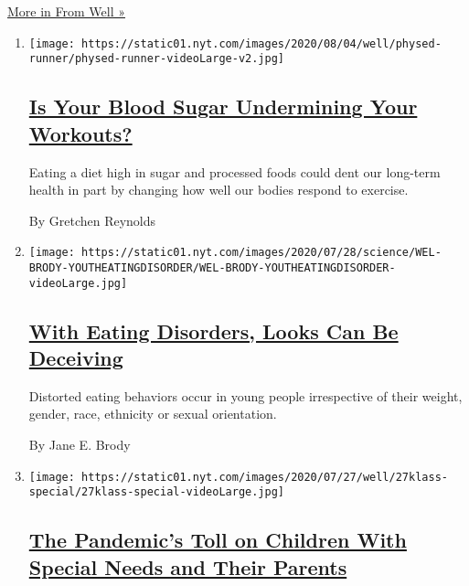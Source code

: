 \href{/section/well}{More in From Well »}

\begin{enumerate}
\def\labelenumi{\arabic{enumi}.}
\item
  \texttt{[image: https://static01.nyt.com/images/2020/08/04/well/physed-runner/physed-runner-videoLarge-v2.jpg]}

  \hypertarget{is-your-blood-sugar-undermining-your-workouts}{%
  \subsection{\texorpdfstring{\href{/2020/07/29/well/move/blood-sugar-diet-foods-workouts-exercise-muscles.html}{Is
  Your Blood Sugar Undermining Your
  Workouts?}}{Is Your Blood Sugar Undermining Your Workouts?}}\label{is-your-blood-sugar-undermining-your-workouts}}

  Eating a diet high in sugar and processed foods could dent our
  long-term health in part by changing how well our bodies respond to
  exercise.

  By Gretchen Reynolds
\item
  \texttt{[image: https://static01.nyt.com/images/2020/07/28/science/WEL-BRODY-YOUTHEATINGDISORDER/WEL-BRODY-YOUTHEATINGDISORDER-videoLarge.jpg]}

  \hypertarget{with-eating-disorders-looks-can-be-deceiving}{%
  \subsection{\texorpdfstring{\href{/2020/07/27/well/eat/eating-disorders.html}{With
  Eating Disorders, Looks Can Be
  Deceiving}}{With Eating Disorders, Looks Can Be Deceiving}}\label{with-eating-disorders-looks-can-be-deceiving}}

  Distorted eating behaviors occur in young people irrespective of their
  weight, gender, race, ethnicity or sexual orientation.

  By Jane E. Brody
\item
  \texttt{[image: https://static01.nyt.com/images/2020/07/27/well/27klass-special/27klass-special-videoLarge.jpg]}

  \hypertarget{the-pandemics-toll-on-children-with-special-needs-and-their-parents}{%
  \subsection{\texorpdfstring{\href{/2020/07/27/well/family/children-special-needs-pandemic.html}{The
  Pandemic's Toll on Children With Special Needs and Their
  Parents}}{The Pandemic's Toll on Children With Special Needs and Their Parents}}\label{the-pandemics-toll-on-children-with-special-needs-and-their-parents}}


\end{enumerate}
